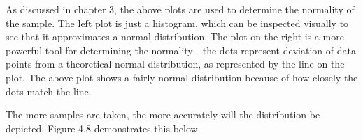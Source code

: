 As discussed in chapter 3, the above plots are used to determine the normality of the sample.  The left plot is just a histogram, which can be inspected visually to see that it approximates a normal distribution.  The plot on the right is a more powerful tool for determining the normality - the dots represent deviation of data points from a theoretical normal distribution, as represented by the line on the plot.  The above plot shows a fairly normal distribution because of how closely the dots match the line.  

The more samples are taken, the more accurately will the distribution be depicted.  Figure 4.8 demonstrates this below 
\begin{knitrout}
\color{fgcolor}\begin{kframe}
\begin{alltt}
 \hlkwb{=} \hlstd{(}\hlstd{,} \hlstd{)}
  \hlopt{:}\hlstd{)\{}
   \hlkwb{=} \hlstd{(} \hlstd{= (}\hlopt{:}  \hlstd{=} \hlstd{,}  \hlstd{=} \hlstd{)}
   \hlkwb{=} 
   \hlkwb{=} \hlopt{$}  \hlstd{=} \hlstd{)}
\hlstd{\}}

\hlstd{(} \hlstd{=} \hlstd{(}\hlstd{,}\hlstd{))}
  \hlstd{=} \hlstd{)}
\end{alltt}
\end{kframe}
\end{knitrout}

